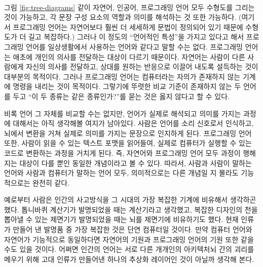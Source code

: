 \documentclass{article}
\begin{document}
\begin{figure*}[ht]
     \\
    \centering
    \caption{위 예시 문장 및 코드의 수형도}
    \label{fig:tree-diagrams}
\end{figure*}

그림 \ref{fig:tree-diagrams} 같이 자연어, 인공어, 프로그래밍 언어 모두 수형도를 그리는 것이 가능하고, 각 문장 구성 요소의 역할과 의미를 해석하는 것 또한 가능하다. (여기서 프로그래밍 언어는 자연어보다 훨씬 더 세세하게 문법이 정의되어 있기 때문에 수형도가 더 길고 복잡하다.) 그러나 이 정도의 ``언어적인 특성''을 가지고 있다고 해서 프로그래밍 언어를 일상생활에서 사용하는 언어와 같다고 말할 수는 없다. 프로그래밍 언어는 애초에 개인의 의사를 전달하는 대상이 다르기 때문이다. 자연어는 사람이 다른 사람에게 자신의 의사를 전달하고, 상대를 원하는 반응으로 이끌어 내도록 설득하는 것이 대부분의 목적이다. 그러나 프로그래밍 언어는 컴퓨터라는 자의가 존재하지 않는 기계에 명령을 내리는 것이 목적이다. 그렇기에 뚜렷한 비교 기준이 존재하지 않는 두 언어를 두고 ``이 두 종류는 같은 종류인가?''를 묻는 것은 옳지 않다고 할 수 있다.

비록 언어 그 자체를 비교할 수는 없지만, 언어가 실제로 해석되고 의미를 가지는 과정에 대해서는 아직 생각해볼 여지가 남아있다. 사람은 언어를 소리 신호로서 인식하고, 뇌에서 변환을 거쳐 실제로 의미를 가지는 문장으로 인지하게 된다. 프로그래밍 언어 또한, 사람이 읽을 수 있는 텍스트 포맷을 읽어들여, 실제로 컴퓨터가 실행할 수 있는 코드로 변환하는 과정을 거치게 된다. 즉, 자연어와 프로그래밍 언어 모두 과정이 행해지는 대상이 다를 뿐인 동일한 개념이라고 볼 수 있다. 따라서, 사람과 사람이 말하는 언어와 사람과 컴퓨터가 말하는 언어 모두, 의미적으로는 다른 개념일 지 몰라도 기능적으로는 완전히 같다.

예로부터 사람은 인간의 사고방식을 그 시대의 가장 복잡한 기계에 비유해서 생각하곤 했다. 톱니바퀴 계산기가 발명되었을 때는 계산기라고 생각했고, 복잡한 디자인의 천을 뽑아낼 수 있는 제면기가 발명되었을 때는 뇌를 제면기에 비유하기도 했다. 현재 인류가 만들어 낸 발명품 중 가장 복잡한 것은 단연 컴퓨터일 것이다. 만약 컴퓨터 언어와 자연어가 기능적으로 동일하다면 자연어의 기원과 프로그래밍 언어의 기원 또한 같을 수도 있을 것이다. 어쩌면 인간의 언어는 서로 다른 개개인의 아키텍처{\tiny 뇌} 간의 괴리를 메우기 위해 고대 인류가 만들어낸 하나의 추상화 레이어인 것이 아닐까 생각해 본다.
\end{document}

